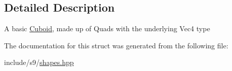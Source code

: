 \subsection{Detailed Description}
A basic \hyperlink{classs9_1_1Cuboid}{Cuboid}, made up of Quads with the underlying Vec4 type 

The documentation for this struct was generated from the following file\-:\begin{DoxyCompactItemize}
\item 
include/s9/\hyperlink{shapes_8hpp}{shapes.\-hpp}\end{DoxyCompactItemize}
